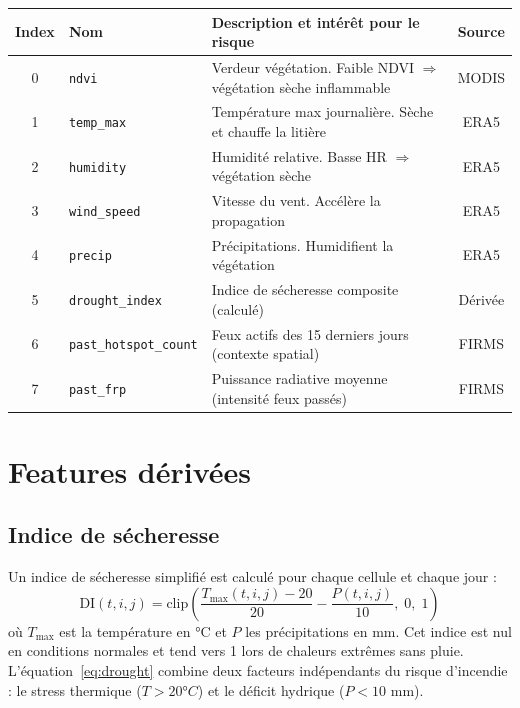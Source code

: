 \documentclass[12pt,a4paper]{report}
\begin{document}
\begin{center}
\begin{tabularx}{\textwidth}{clXc}
\toprule
\rowcolor{fireOrange!15}
\textbf{Index} & \textbf{Nom} & \textbf{Description et intérêt pour le risque} & \textbf{Source} \\
\midrule
0 & \texttt{ndvi}               & Verdeur végétation. Faible NDVI $\Rightarrow$ végétation sèche
                                   inflammable                                     & MODIS \\
1 & \texttt{temp\_max}           & Température max journalière. Sèche et chauffe la litière   & ERA5 \\
2 & \texttt{humidity}            & Humidité relative. Basse HR $\Rightarrow$ végétation sèche & ERA5 \\
3 & \texttt{wind\_speed}         & Vitesse du vent. Accélère la propagation                   & ERA5 \\
4 & \texttt{precip}              & Précipitations. Humidifient la végétation                  & ERA5 \\
5 & \texttt{drought\_index}      & Indice de sécheresse composite (calculé)                   & Dérivée \\
6 & \texttt{past\_hotspot\_count}& Feux actifs des 15 derniers jours (contexte spatial)        & FIRMS \\
7 & \texttt{past\_frp}           & Puissance radiative moyenne (intensité feux passés)         & FIRMS \\
\bottomrule
\end{tabularx}
\end{center}

\section{Features dérivées}

\subsection{Indice de sécheresse}

Un indice de sécheresse simplifié est calculé pour chaque cellule et chaque jour :
\begin{equation}
  \text{DI}(t, i, j) = \text{clip}\!\left(
    \frac{T_{\max}(t, i, j) - 20}{20} - \frac{P(t, i, j)}{10},\; 0,\; 1
  \right)
  \label{eq:drought}
\end{equation}
où $T_{\max}$ est la température en °C et $P$ les précipitations en mm. Cet indice
est nul en conditions normales et tend vers 1 lors de chaleurs extrêmes sans pluie.
L'équation~\eqref{eq:drought} combine deux facteurs indépendants du risque d'incendie :
le stress thermique ($T > 20°C$) et le déficit hydrique ($P < 10$ mm).
\end{document}
